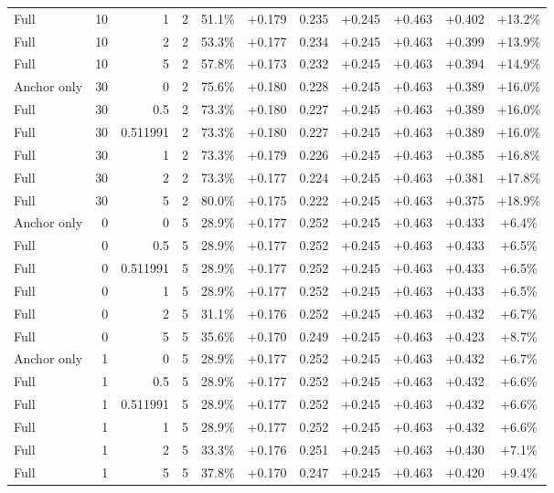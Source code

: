 \begin{table}[htbp]
\begin{tabular}{lrrrccccccc}
Full & 10 & 1 & 2 & 51.1\% & +0.179 & 0.235 & +0.245 & +0.463 & +0.402 & +13.2\% \\
Full & 10 & 2 & 2 & 53.3\% & +0.177 & 0.234 & +0.245 & +0.463 & +0.399 & +13.9\% \\
Full & 10 & 5 & 2 & 57.8\% & +0.173 & 0.232 & +0.245 & +0.463 & +0.394 & +14.9\% \\
Anchor only & 30 & 0 & 2 & 75.6\% & +0.180 & 0.228 & +0.245 & +0.463 & +0.389 & +16.0\% \\
Full & 30 & 0.5 & 2 & 73.3\% & +0.180 & 0.227 & +0.245 & +0.463 & +0.389 & +16.0\% \\
Full & 30 & 0.511991 & 2 & 73.3\% & +0.180 & 0.227 & +0.245 & +0.463 & +0.389 & +16.0\% \\
Full & 30 & 1 & 2 & 73.3\% & +0.179 & 0.226 & +0.245 & +0.463 & +0.385 & +16.8\% \\
Full & 30 & 2 & 2 & 73.3\% & +0.177 & 0.224 & +0.245 & +0.463 & +0.381 & +17.8\% \\
Full & 30 & 5 & 2 & 80.0\% & +0.175 & 0.222 & +0.245 & +0.463 & +0.375 & +18.9\% \\
Anchor only & 0 & 0 & 5 & 28.9\% & +0.177 & 0.252 & +0.245 & +0.463 & +0.433 & +6.4\% \\
Full & 0 & 0.5 & 5 & 28.9\% & +0.177 & 0.252 & +0.245 & +0.463 & +0.433 & +6.5\% \\
Full & 0 & 0.511991 & 5 & 28.9\% & +0.177 & 0.252 & +0.245 & +0.463 & +0.433 & +6.5\% \\
Full & 0 & 1 & 5 & 28.9\% & +0.177 & 0.252 & +0.245 & +0.463 & +0.433 & +6.5\% \\
Full & 0 & 2 & 5 & 31.1\% & +0.176 & 0.252 & +0.245 & +0.463 & +0.432 & +6.7\% \\
Full & 0 & 5 & 5 & 35.6\% & +0.170 & 0.249 & +0.245 & +0.463 & +0.423 & +8.7\% \\
Anchor only & 1 & 0 & 5 & 28.9\% & +0.177 & 0.252 & +0.245 & +0.463 & +0.432 & +6.7\% \\
Full & 1 & 0.5 & 5 & 28.9\% & +0.177 & 0.252 & +0.245 & +0.463 & +0.432 & +6.6\% \\
Full & 1 & 0.511991 & 5 & 28.9\% & +0.177 & 0.252 & +0.245 & +0.463 & +0.432 & +6.6\% \\
Full & 1 & 1 & 5 & 28.9\% & +0.177 & 0.252 & +0.245 & +0.463 & +0.432 & +6.6\% \\
Full & 1 & 2 & 5 & 33.3\% & +0.176 & 0.251 & +0.245 & +0.463 & +0.430 & +7.1\% \\
Full & 1 & 5 & 5 & 37.8\% & +0.170 & 0.247 & +0.245 & +0.463 & +0.420 & +9.4\% \\

\end{tabular}
\end{table}
